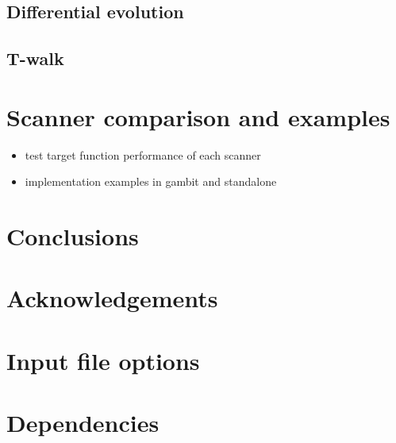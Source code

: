 \documentclass[11pt,a4paper]{article}
\begin{document}
\subsection{Differential evolution}
\subsection{T-walk}

\section{Scanner comparison and examples}
\begin{itemize}
\item test target function performance of each scanner
\item implementation examples in gambit and standalone
\end{itemize}

\section{Conclusions}

\section{Acknowledgements}

\appendix
\section{Input file options}
\section{Dependencies}
\end{document}
